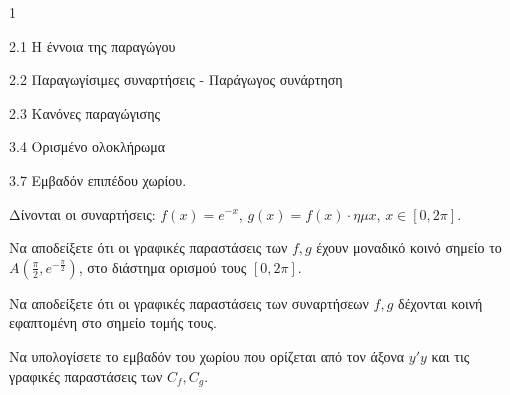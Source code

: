 \begin{ylh}{1}
    \item 2.1 Η έννοια της παραγώγου
    \item 2.2 Παραγωγίσιμες συναρτήσεις - Παράγωγος συνάρτηση
    \item 2.3 Κανόνες παραγώγισης
    \item 3.4 Ορισμένο ολοκλήρωμα
    \item 3.7 Εμβαδόν επιπέδου χωρίου.
\end{ylh}
Δίνονται οι συναρτήσεις: $f(x)=e^{-x}$, $g(x)=f(x) \cdot \eta \mu x$, $x \in [0,2\pi]$.
\begin{alist}
\item Να αποδείξετε ότι οι γραφικές παραστάσεις των $f,g$ έχουν μοναδικό κοινό σημείο το $A\left(\frac{\pi}{2},e^{-\frac{\pi}{2}}\right)$, στο διάστημα ορισμού τους $[0,2\pi]$.  
\item Να αποδείξετε ότι οι γραφικές παραστάσεις των συναρτήσεων $f,g$ δέχονται κοινή εφαπτομένη στο σημείο τομής τους.  
\item Να υπολογίσετε το εμβαδόν του χωρίου που ορίζεται από τον άξονα $y'y$ και τις γραφικές παραστάσεις των $C_f,C_g$.  
\end{alist}